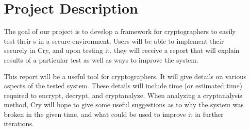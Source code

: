 \section{Project Description}


The goal of our project is to develop a framework for
cryptographers to easily test their \cs s in a
secure environment. Users will be able to implement their
\cs{} securely in Cry, and upon testing it, they will
receive a report that will explain results of a particular
test as well as ways to improve the system.

\medskip

This report will be a useful tool for cryptographers. It
will give details on various aspects of the tested system.
These details will include time (or estimated time) required
to encrypt, decrypt, and cryptanalyze. When analyzing a
cryptanalysis method, Cry will hope to give some useful
suggestions as to why the system was broken in the given
time, and what could be used to improve it in further
iterations.
